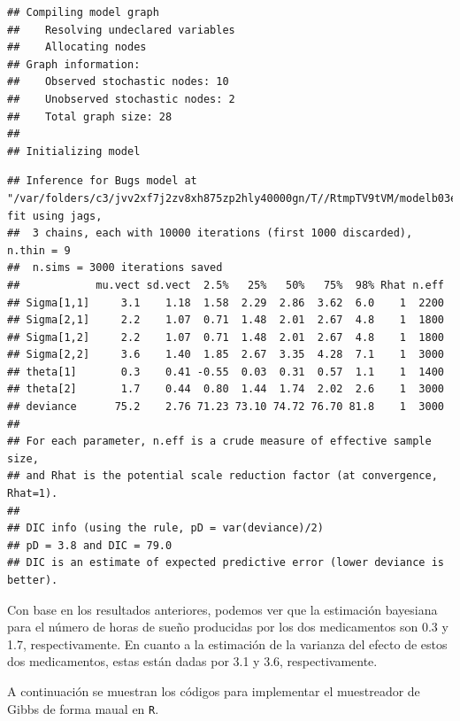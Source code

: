 \begin{Eje}
\begin{knitrout}
\begin{kframe}
\begin{alltt}
 \hlkwb{<-} \hlstd{(} 
                      \hlstd{=}\hlstd{,} \hlstd{=}\hlstd{,} 
\end{alltt}
\begin{verbatim}
## Compiling model graph
##    Resolving undeclared variables
##    Allocating nodes
## Graph information:
##    Observed stochastic nodes: 10
##    Unobserved stochastic nodes: 2
##    Total graph size: 28
## 
## Initializing model
\end{verbatim}
\begin{alltt}
\end{alltt}
\begin{verbatim}
## Inference for Bugs model at "/var/folders/c3/jvv2xf7j2zv8xh875zp2hly40000gn/T//RtmpTV9tVM/modelb03e3893c31f.txt", fit using jags,
##  3 chains, each with 10000 iterations (first 1000 discarded), n.thin = 9
##  n.sims = 3000 iterations saved
##            mu.vect sd.vect  2.5%   25%   50%   75%  98% Rhat n.eff
## Sigma[1,1]     3.1    1.18  1.58  2.29  2.86  3.62  6.0    1  2200
## Sigma[2,1]     2.2    1.07  0.71  1.48  2.01  2.67  4.8    1  1800
## Sigma[1,2]     2.2    1.07  0.71  1.48  2.01  2.67  4.8    1  1800
## Sigma[2,2]     3.6    1.40  1.85  2.67  3.35  4.28  7.1    1  3000
## theta[1]       0.3    0.41 -0.55  0.03  0.31  0.57  1.1    1  1400
## theta[2]       1.7    0.44  0.80  1.44  1.74  2.02  2.6    1  3000
## deviance      75.2    2.76 71.23 73.10 74.72 76.70 81.8    1  3000
## 
## For each parameter, n.eff is a crude measure of effective sample size,
## and Rhat is the potential scale reduction factor (at convergence, Rhat=1).
## 
## DIC info (using the rule, pD = var(deviance)/2)
## pD = 3.8 and DIC = 79.0
## DIC is an estimate of expected predictive error (lower deviance is better).
\end{verbatim}
\end{kframe}
\end{knitrout}

Con base en los resultados anteriores, podemos ver que la estimación bayesiana para el número de horas de sueño producidas por los dos medicamentos son 0.3 y 1.7, respectivamente. En cuanto a la estimación de la varianza del efecto de estos dos medicamentos, estas están dadas por 3.1 y 3.6, respectivamente.

A continuación se muestran los códigos para implementar el muestreador de Gibbs de forma maual en \verb'R'.


\end{Eje}
